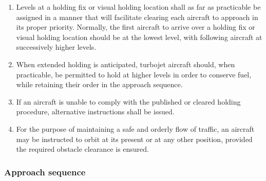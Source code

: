\documentclass[../main.tex]{subfiles}
\begin{document}
\begin{enumerate}
        \item Levels at a holding fix or visual holding location shall as far as practicable be assigned in a manner that will facilitate clearing each aircraft to approach in its proper priority. Normally, the first aircraft to arrive over a holding fix or visual holding location should be at the lowest level, with following aircraft at successively higher levels.
        \item When extended holding is anticipated, turbojet aircraft should, when practicable, be permitted to hold at higher levels in order to conserve fuel, while retaining their order in the approach sequence.
        \item If an aircraft is unable to comply with the published or cleared holding procedure, alternative instructions shall be issued.
        \item For the purpose of maintaining a safe and orderly flow of traffic, an aircraft may be instructed to orbit at its present or at any other position, provided the required obstacle clearance is ensured.
    \end{enumerate}

    \subsubsection{Approach sequence}
\end{document}
